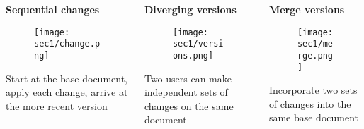 \begin{frame}[fragile]
\emptyframetitle
  \begin{columns}
    \begin{column}{0.33\textwidth}
{\bf Sequential changes}
      \begin{figure}[h]
      \texttt{[image: sec1/change.png]}
      \end{figure}
      Start at the base document, apply each change, arrive at the more recent version
    \end{column}
    \begin{column}{0.33\textwidth}
{\bf Diverging versions}
      \begin{figure}[h]
      \texttt{[image: sec1/versions.png]}
      \end{figure}
      Two users can make independent sets of changes on the same document
    \end{column}
    \begin{column}{0.33\textwidth}
{\bf Merge versions}
      \begin{figure}[h]
      \texttt{[image: sec1/merge.png]}
      \end{figure}
      Incorporate two sets of changes into the same base document
    \end{column}

  \end{columns}

\end{frame}
